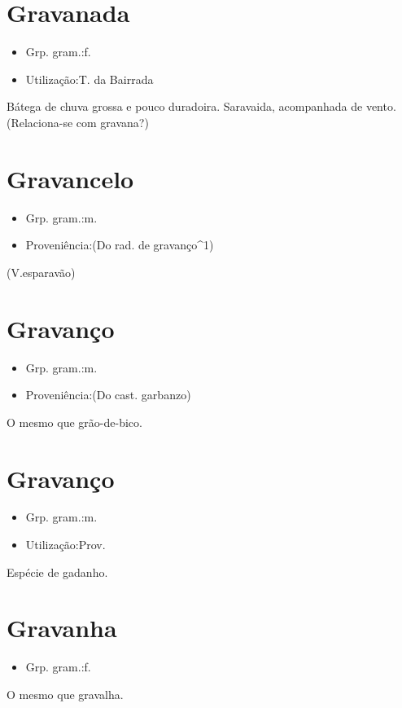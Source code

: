\section{Gravanada}
\begin{itemize}
\item {Grp. gram.:f.}
\end{itemize}
\begin{itemize}
\item {Utilização:T. da Bairrada}
\end{itemize}
Bátega de chuva grossa e pouco duradoira.
Saravaida, acompanhada de vento.
(Relaciona-se com \textunderscore gravana\textunderscore ?)
\section{Gravancelo}
\begin{itemize}
\item {Grp. gram.:m.}
\end{itemize}
\begin{itemize}
\item {Proveniência:(Do rad. de \textunderscore gravanço\textunderscore ^1)}
\end{itemize}
(V.esparavão)
\section{Gravanço}
\begin{itemize}
\item {Grp. gram.:m.}
\end{itemize}
\begin{itemize}
\item {Proveniência:(Do cast. \textunderscore garbanzo\textunderscore )}
\end{itemize}
O mesmo que \textunderscore grão-de-bico\textunderscore .
\section{Gravanço}
\begin{itemize}
\item {Grp. gram.:m.}
\end{itemize}
\begin{itemize}
\item {Utilização:Prov.}
\end{itemize}
Espécie de gadanho.
\section{Gravanha}
\begin{itemize}
\item {Grp. gram.:f.}
\end{itemize}
O mesmo que \textunderscore gravalha\textunderscore .
